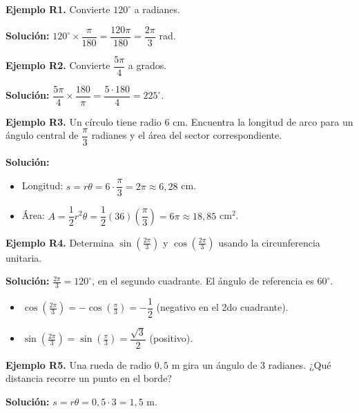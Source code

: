 \documentclass[12pt, letterpaper]{article}
\begin{document}
\textbf{Ejemplo R1.} Convierte $120^\circ$ a radianes.

\begin{cuadrosolucion}
  \textbf{Solución:} $120^\circ \times \dfrac{\pi}{180} = \dfrac{120\pi}{180} = \dfrac{2\pi}{3}$ rad.
\end{cuadrosolucion}

\textbf{Ejemplo R2.} Convierte $\dfrac{5\pi}{4}$ a grados.

\begin{cuadrosolucion}
  \textbf{Solución:} $\dfrac{5\pi}{4} \times \dfrac{180}{\pi} = \dfrac{5 \cdot 180}{4} = 225^\circ$.
\end{cuadrosolucion}

\textbf{Ejemplo R3.} Un círculo tiene radio $6$ cm. Encuentra la longitud de arco para un ángulo central de $\dfrac{\pi}{3}$ radianes y el área del sector correspondiente.

\begin{cuadrosolucion}
  \textbf{Solución:}
  \begin{itemize}
    \item Longitud: $s = r\theta = 6 \cdot \dfrac{\pi}{3} = 2\pi \approx 6{,}28$ cm.
    \item Área: $A = \dfrac{1}{2}r^2\theta = \dfrac{1}{2}(36)\left(\dfrac{\pi}{3}\right) = 6\pi \approx 18{,}85$ cm$^2$.
  \end{itemize}
\end{cuadrosolucion}

\textbf{Ejemplo R4.} Determina $\sin\left(\frac{2\pi}{3}\right)$ y $\cos\left(\frac{2\pi}{3}\right)$ usando la circunferencia unitaria.

\begin{cuadrosolucion}
  \textbf{Solución:} $\frac{2\pi}{3} = 120^\circ$, en el segundo cuadrante. El ángulo de referencia es $60^\circ$.
  \begin{itemize}
    \item $\cos\left(\frac{2\pi}{3}\right) = -\cos\left(\frac{\pi}{3}\right) = -\dfrac{1}{2}$ (negativo en el 2do cuadrante).
    \item $\sin\left(\frac{2\pi}{3}\right) = \sin\left(\frac{\pi}{3}\right) = \dfrac{\sqrt{3}}{2}$ (positivo).
  \end{itemize}
\end{cuadrosolucion}

\textbf{Ejemplo R5.} Una rueda de radio $0{,}5$ m gira un ángulo de $3$ radianes. ¿Qué distancia recorre un punto en el borde?

\begin{cuadrosolucion}
  \textbf{Solución:} $s = r\theta = 0{,}5 \cdot 3 = 1{,}5$ m.
\end{cuadrosolucion}
\end{document}
